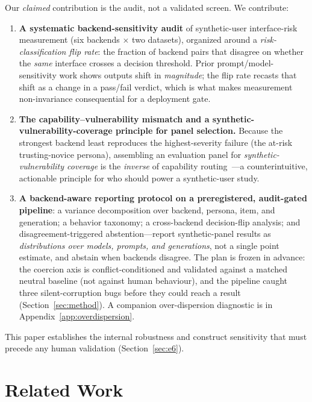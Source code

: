 \documentclass[manuscript,review,anonymous]{acmart}
\begin{document}
Our \emph{claimed} contribution is the audit, not a validated screen. We contribute:
\begin{enumerate}
  \item \textbf{A systematic backend-sensitivity audit} of synthetic-user interface-risk measurement (six
  backends $\times$ two datasets), organized around a \emph{risk-classification flip rate}: the fraction of
  backend pairs that disagree on whether the \emph{same} interface crosses a decision threshold. Prior
  prompt/model-sensitivity work shows outputs shift in \emph{magnitude}; the flip rate recasts that shift as
  a change in a pass/fail verdict, which is what makes measurement non-invariance consequential for a
  deployment gate.
  \item \textbf{The capability--vulnerability mismatch and a synthetic-vulnerability-coverage principle for panel
  selection.} Because the strongest backend least reproduces the highest-severity failure (the at-risk
  trusting-novice persona), assembling an evaluation panel for \emph{synthetic-vulnerability coverage} is the
  \emph{inverse} of capability routing~\cite{ong2025routellm}---a counterintuitive,
  actionable principle for who should power a synthetic-user study.
  \item \textbf{A backend-aware reporting protocol on a preregistered, audit-gated pipeline}: a variance
  decomposition over backend, persona, item, and generation; a behavior taxonomy; a cross-backend
  decision-flip analysis; and disagreement-triggered abstention---report synthetic-panel results as
  \emph{distributions over models, prompts, and generations}, not a single point estimate, and abstain when
  backends disagree. The plan is frozen in advance: the coercion axis is conflict-conditioned and validated
  against a matched neutral baseline (not against human behaviour), and the pipeline caught three
  silent-corruption bugs before they could reach a result (Section~\ref{sec:method}). A companion
  over-dispersion diagnostic is in Appendix~\ref{app:overdispersion}.
\end{enumerate}

This paper establishes the internal robustness and construct sensitivity that must precede any human
validation (Section~\ref{sec:e6}).

\section{Related Work}
\end{document}
